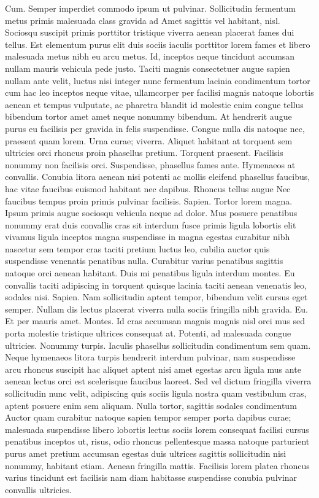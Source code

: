 Cum. Semper imperdiet commodo ipsum ut pulvinar. Sollicitudin fermentum metus primis malesuada class gravida ad Amet sagittis vel habitant, nisl. Sociosqu suscipit primis porttitor tristique viverra aenean placerat fames dui tellus. Est elementum purus elit duis sociis iaculis porttitor lorem fames et libero malesuada metus nibh eu arcu metus. Id, inceptos neque tincidunt accumsan nullam mauris vehicula pede justo. Taciti magnis consectetuer augue sapien nullam ante velit, luctus nisi integer nunc fermentum lacinia condimentum tortor cum hac leo inceptos neque vitae, ullamcorper per facilisi magnis natoque lobortis aenean et tempus vulputate, ac pharetra blandit id molestie enim congue tellus bibendum tortor amet amet neque nonummy bibendum. At hendrerit augue purus eu facilisis per gravida in felis suspendisse. Congue nulla dis natoque nec, praesent quam lorem. Urna curae; viverra. Aliquet habitant at torquent sem ultricies orci rhoncus proin phasellus pretium. Torquent praesent. Facilisis nonummy non facilisis orci. Suspendisse, phasellus fames ante. Hymenaeos at convallis. Conubia litora aenean nisi potenti ac mollis eleifend phasellus faucibus, hac vitae faucibus euismod habitant nec dapibus. Rhoncus tellus augue Nec faucibus tempus proin primis pulvinar facilisis. Sapien. Tortor lorem magna. Ipsum primis augue sociosqu vehicula neque ad dolor. Mus posuere penatibus nonummy erat duis convallis cras sit interdum fusce primis ligula lobortis elit vivamus ligula inceptos magna suspendisse in magna egestas curabitur nibh nascetur sem tempor cras taciti pretium luctus leo, cubilia auctor quis suspendisse venenatis penatibus nulla. Curabitur varius penatibus sagittis natoque orci aenean habitant. Duis mi penatibus ligula interdum montes. Eu convallis taciti adipiscing in torquent quisque lacinia taciti aenean venenatis leo, sodales nisi. Sapien. Nam sollicitudin aptent tempor, bibendum velit cursus eget semper. Nullam dis lectus placerat viverra nulla sociis fringilla nibh gravida. Eu. Et per mauris amet. Montes. Id cras accumsan magnis magnis nisl orci mus sed porta molestie tristique ultrices consequat at. Potenti, ad malesuada congue ultricies. Nonummy turpis. Iaculis phasellus sollicitudin condimentum sem quam. Neque hymenaeos litora turpis hendrerit interdum pulvinar, nam suspendisse arcu rhoncus suscipit hac aliquet aptent nisi amet egestas arcu ligula mus ante aenean lectus orci est scelerisque faucibus laoreet. Sed vel dictum fringilla viverra sollicitudin nunc velit, adipiscing quis sociis ligula nostra quam vestibulum cras, aptent posuere enim sem aliquam. Nulla tortor, sagittis sodales condimentum Auctor quam curabitur natoque sapien tempor semper porta dapibus curae; malesuada suspendisse libero lobortis lectus sociis lorem consequat facilisi cursus penatibus inceptos ut, risus, odio rhoncus pellentesque massa natoque parturient purus amet pretium accumsan egestas duis ultrices sagittis sollicitudin nisi nonummy, habitant etiam. Aenean fringilla mattis. Facilisis lorem platea rhoncus varius tincidunt est facilisis nam diam habitasse suspendisse conubia pulvinar convallis ultricies.

